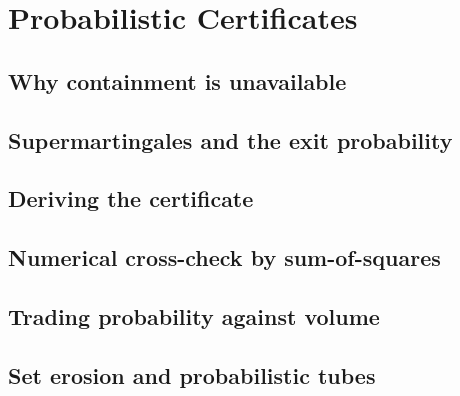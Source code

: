 
\section{Probabilistic Certificates}
\label{p3:sec:certificates}

\subsection{Why containment is unavailable}
\label{p3:sub:why_containment_unavailable}

\subsection{Supermartingales and the exit probability}
\label{p3:sub:supermartingales}

\subsection{Deriving the certificate}
\label{p3:sub:deriving_the_certificate}

\subsection{Numerical cross-check by sum-of-squares}
\label{p3:sub:sos_cross_check}

\subsection{Trading probability against volume}
\label{p3:sub:trading_probability_against_volume}

\subsection{Set erosion and probabilistic tubes}
\label{p3:sub:set_erosion}
